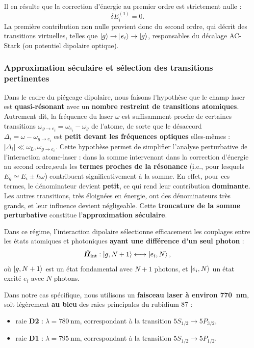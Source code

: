 \bigskip

\noindent Il en résulte que la correction d’énergie au premier ordre est strictement nulle :
\[
\delta E_i^{(1)} = 0.
\]
La première contribution non nulle provient donc du second ordre, qui décrit des transitions virtuelles, telles que \( \ket{g} \to \ket{e_i} \to \ket{g} \), responsables du décalage AC-Stark (ou potentiel dipolaire optique).

\subsubsection*{Approximation séculaire et sélection des transitions pertinentes}

Dans le cadre du piégeage dipolaire, nous faisons l’hypothèse que le champ laser est \textbf{quasi-résonant} avec un \textbf{nombre restreint de transitions atomiques}. Autrement dit, la fréquence du laser \( \omega \) est suffisamment proche de certaines transitions \( \omega_{g \rightarrow e_i} = \omega_{e_i} - \omega_g  \) de l’atome, de sorte que le désaccord \( \Delta_i = \omega - \omega_{g \rightarrow e_i} \) est \textbf{petit devant les fréquences optiques} elles-mêmes :
\(
|\Delta_i| \ll \omega_L, \omega_{g \rightarrow e_i}.
\)
Cette hypothèse permet de simplifier l’analyse perturbative de l’interaction atome-laser : dans la somme intervenant dans la correction d’énergie au second ordre,seuls les \textbf{termes proches de la résonance} (i.e., pour lesquels \( E_g \simeq E_i \pm \hbar \omega \)) contribuent significativement à la somme. En effet, pour ces termes, le dénominateur devient \textbf{petit}, ce qui rend leur contribution \textbf{dominante}. Les autres transitions, très éloignées en énergie, ont des dénominateurs très grands, et leur influence devient négligeable. Cette \textbf{troncature de la somme perturbative} constitue l’\textbf{approximation séculaire}.

Dans ce régime, l’interaction dipolaire sélectionne efficacement les couplages entre les états atomiques et photoniques \textbf{ayant une différence d’un seul photon} :
\[
\hat{\bm{H}}_{\text{int}} : \ket{g, N+1} \longleftrightarrow \ket{e_i, N},
\]
où \( \ket{g, N+1} \) est un état fondamental avec \( N+1 \) photons, et \( \ket{e_i, N} \) un état excité \( e_i \) avec \( N \) photons.

\medskip

Dans notre cas spécifique, nous utilisons un \textbf{faisceau laser à environ 770~nm}, soit légèrement \textbf{au bleu} des raies principales du rubidium 87 :
\begin{itemize}[label = $\bullet$]
  \item raie \textbf{D2} : \( \lambda = 780~\text{nm} \), correspondant à la transition \( 5S_{1/2} \rightarrow 5P_{3/2} \),
  \item raie \textbf{D1} : \( \lambda = 795~\text{nm} \), correspondant à la transition \( 5S_{1/2} \rightarrow 5P_{1/2} \).
\end{itemize}

